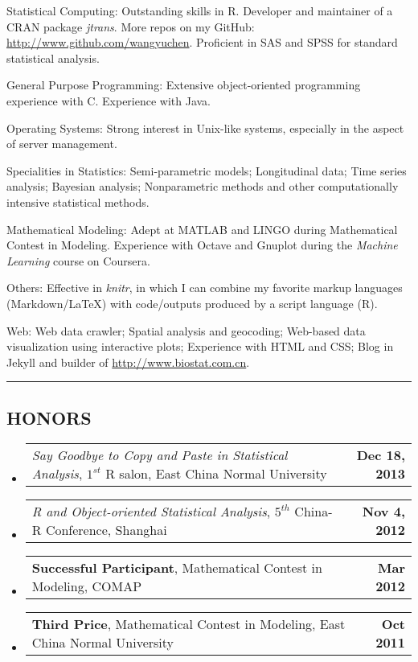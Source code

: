 \documentclass[10pt]{article}
\makeatletter
\newenvironment{unindentsection}[1]%
{\begin{list}{}%
	{\setlength{\leftmargin}{-0.5#1}}%
	\item[]%
}
{\end{list}}
\newcommand{\headerrow}[2]
{\begin{tabular*}{\linewidth}{l@{\extracolsep{\fill}}r}
	#1 &
	#2 \\
\end{tabular*}}
\newcommand{\CPP}
{C\nolinebreak[4]\hspace{-.05em}\raisebox{.22ex}{\footnotesize\bf ++}}
\makeatother
\begin{document}
\begin{description*}
	\item[Statistical Computing:] Outstanding skills in R. Developer and maintainer of a CRAN package \emph{jtrans}. More repos on my GitHub: \url{http://www.github.com/wangyuchen}. Proficient in SAS and SPSS for standard statistical analysis.
	\item[General Purpose Programming:] Extensive object-oriented programming experience with \CPP. Experience with Java.
	\item[Operating Systems:] Strong interest in Unix-like systems, especially in the aspect of server management.
	\item[Specialities in Statistics:] Semi-parametric models; Longitudinal data; Time series analysis; Bayesian analysis; Nonparametric methods and other computationally intensive statistical methods.
	\item[Mathematical Modeling:] Adept at MATLAB and LINGO during Mathematical Contest in Modeling. Experience with Octave and Gnuplot during the \emph{Machine Learning} course on Coursera.
	\item[Others:] Effective in \emph{knitr}, in which I can combine my favorite markup languages (Markdown/\LaTeX) with code/outputs produced by a script language (R).
	\item[Web:] Web data crawler; Spatial analysis and geocoding; Web-based data visualization using interactive plots; Experience with HTML and CSS; Blog in Jekyll and builder of \url{http://www.biostat.com.cn}. 
\end{description*}


\vspace{0.2em}
\hrule
\vspace{-1em}

\subsection*{\centering HONORS}

\begin{unindentsection}{\parindent}
	\begin{itemize}
		\item
		\headerrow
			{\emph{Say Goodbye to Copy and Paste in Statistical Analysis}, $1^{st}$ R salon, East China Normal University}
			{\textbf{Dec 18, 2013}}
		\item 
		\headerrow
			{\emph{R and Object-oriented Statistical Analysis}, $5^{th}$ China-R Conference, Shanghai}
			{\textbf{Nov 4, 2012}}
		\item 
		\headerrow
			{\textbf{Successful Participant}, Mathematical Contest in Modeling, COMAP}
			{\textbf{Mar 2012}}
		\item
		\headerrow
			{\textbf{Third Price}, Mathematical Contest in Modeling, East China Normal University}
			{\textbf{Oct 2011}}
		
	\end{itemize}
\end{unindentsection}
\end{document}
